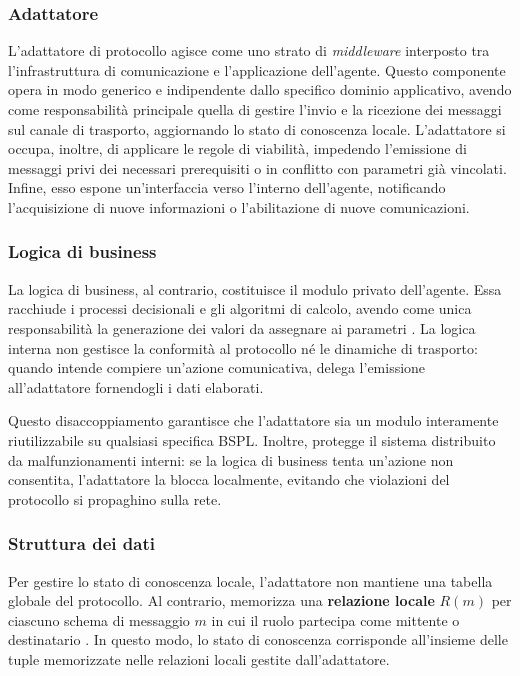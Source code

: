\subsubsection{Adattatore}\label{bspl:adattatore}

L'adattatore di protocollo agisce come uno strato di \emph{middleware} interposto tra 
l'infrastruttura di comunicazione e l'applicazione dell'agente. 
Questo componente opera in modo generico e indipendente dallo specifico dominio applicativo,
avendo come responsabilità principale quella di gestire l'invio e la ricezione dei messaggi
sul canale di trasporto, aggiornando lo stato di conoscenza locale. 
L'adattatore si occupa, inoltre, di applicare le regole di viabilità, impedendo l'emissione 
di messaggi privi dei necessari prerequisiti  o in conflitto con
parametri  già vincolati. 
Infine, esso espone un'interfaccia verso l'interno dell'agente, notificando l'acquisizione di
nuove informazioni o l'abilitazione di nuove comunicazioni.

\subsubsection{Logica di business}\label{bspl:logica}

La logica di business, al contrario, costituisce il modulo privato dell'agente. 
Essa racchiude i processi decisionali e gli algoritmi di calcolo, 
avendo come unica responsabilità la generazione dei valori da assegnare ai parametri . 
La logica interna non gestisce la conformità al protocollo né le dinamiche di trasporto: quando 
intende compiere un'azione comunicativa, delega l'emissione all'adattatore fornendogli i dati elaborati.

Questo disaccoppiamento garantisce che l'adattatore sia un modulo interamente riutilizzabile su 
qualsiasi specifica BSPL. Inoltre, protegge il sistema distribuito da malfunzionamenti interni: 
se la logica di business tenta un'azione non consentita, l'adattatore la blocca localmente, 
evitando che violazioni del protocollo si propaghino sulla rete.


\subsubsection{Struttura dei dati}\label{bspl:struttura-dati}

Per gestire lo stato di conoscenza locale, l'adattatore non mantiene una tabella globale 
del protocollo. Al contrario, memorizza una \textbf{relazione locale} $R(m)$ 
per ciascuno schema di messaggio $m$ in cui il ruolo partecipa come mittente o destinatario \autocite{singh2011lost}.
In questo modo, lo stato di conoscenza corrisponde all'insieme delle tuple
memorizzate nelle relazioni locali gestite dall'adattatore.

